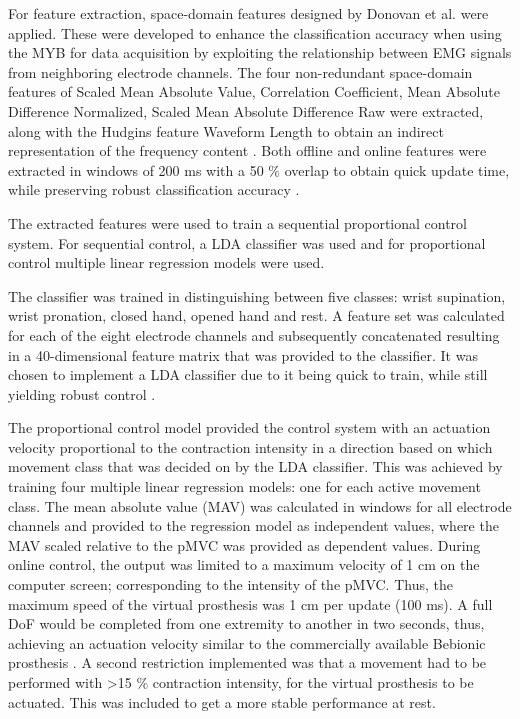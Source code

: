 For feature extraction, space-domain features designed by Donovan et al. \cite{Donovan2017} were applied. These were developed to enhance the classification accuracy when using the MYB for data acquisition by exploiting the relationship between EMG signals from neighboring electrode channels. The four non-redundant space-domain features of Scaled Mean Absolute Value, Correlation Coefficient, Mean Absolute Difference Normalized, Scaled Mean Absolute Difference Raw were extracted, along with the Hudgins feature Waveform Length to obtain an indirect representation of the frequency content \cite{Hudgins1993}. Both offline and online features were extracted in windows of 200 ms with a 50 $\%$ overlap to obtain quick update time, while preserving robust classification accuracy \cite{Menon2017}.

The extracted features were used to train a sequential proportional control system. For sequential control, a LDA classifier was used and for proportional control multiple linear regression models were used.

The classifier was trained in distinguishing between five classes: wrist supination, wrist pronation, closed hand, opened hand and rest. A feature set was calculated for each of the eight electrode channels and subsequently concatenated resulting in a 40-dimensional feature matrix that was provided to the classifier. It was chosen to implement a LDA classifier due to it being quick to train, while still yielding robust control \cite{Englehart2003}.  

 The proportional control model provided the control system with an actuation velocity proportional to the contraction intensity in a direction based on which movement class that was decided on by the LDA classifier. This was achieved by training four multiple linear regression models: one for each active movement class. The mean absolute value (MAV) was calculated in windows for all electrode channels and provided to the regression model as independent values, where the MAV scaled relative to the pMVC was provided as dependent values. During online control, the output was limited to a maximum velocity of 1 cm on the computer screen; corresponding to the intensity of the pMVC. Thus, the maximum speed of the virtual prosthesis was 1 cm per update (100 ms). A full DoF would be completed from one extremity to another in two seconds, thus, achieving an actuation velocity similar to the commercially available Bebionic prosthesis \cite{Belter2013}. A second restriction implemented was that a movement had to be performed with >15 $\%$ contraction intensity, for the virtual prosthesis to be actuated. This was included to get a more stable performance at rest. 
